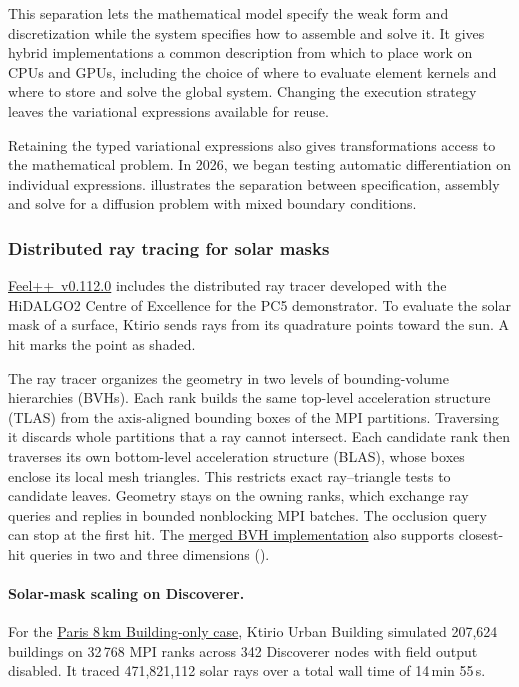 This separation lets the mathematical model specify the weak form and
discretization while the system specifies how to assemble and solve it.
It gives hybrid implementations a common description from which to place
work on CPUs and GPUs, including the choice of where to evaluate element
kernels and where to store and solve the global system. Changing the
execution strategy leaves the variational expressions available for reuse.

Retaining the typed variational expressions also gives transformations
access to the mathematical problem. In 2026, we began testing automatic
differentiation on individual expressions. 
illustrates the separation between specification, assembly and solve for
a diffusion problem with mixed boundary conditions.

\subsubsection{Distributed ray tracing for solar masks}
\label{sec:Feelpp:implementation-2026:bvh}
\href{https://github.com/feelpp/feelpp/releases/tag/v0.112.0}{Feel++~v0.112.0}
includes the distributed ray tracer developed with the HiDALGO2 Centre of
Excellence for the PC5 \KtirioUrbanBuildingContext{} demonstrator. To
evaluate the solar mask of a surface, Ktirio sends rays from its quadrature
points toward the sun. A hit marks the point as shaded.

The ray tracer organizes the geometry in two levels of bounding-volume
hierarchies (BVHs). Each rank builds the same top-level acceleration
structure (TLAS) from the axis-aligned bounding boxes of the MPI partitions.
Traversing it discards whole partitions that a ray cannot intersect.
Each candidate rank then traverses its own bottom-level
acceleration structure (BLAS), whose boxes enclose its local mesh triangles.
This restricts exact ray--triangle tests to candidate leaves. Geometry stays
on the owning ranks, which exchange ray queries and replies in bounded
nonblocking MPI batches. The occlusion query can stop at the first hit.
The \href{https://github.com/feelpp/feelpp/pull/2494}{merged BVH implementation}
also supports closest-hit queries in two and three dimensions
().

\paragraph{Solar-mask scaling on Discoverer.}
For the \href{https://exa-ma.numpex.fr/highlights/ktirio-paris-8km.html}{Paris 8\,km Building-only case},
Ktirio Urban Building simulated 207,624 buildings on 32\,768 MPI ranks
across 342 Discoverer nodes with field output disabled. It traced
471,821,112 solar rays over a total wall time of 14\,min 55\,s.

